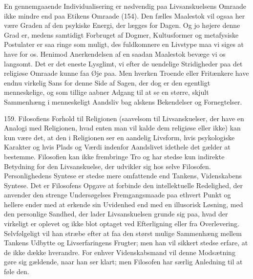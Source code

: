 \documentclass[12pt,a4paper]{book}
\newcommand{\apage}[1]{\marginnote{\footnotesize\textit{[#1]}}}
\begin{document}
En gennemgaaende Individualisering er nødvendig paa Livsanskuelsens Omraade ikke mindre end
paa Etikens Omraade (154). Den fælles Maalestok vil ogsaa her være Graden af den psykiske
Energi, der lægges for Dagen. Og jo højere denne Grad er, medens samtidigt Forbruget af
Dogmer, Kultusformer og metafysiske Postulater er saa ringe som muligt, des fuldkomnere en
Livstype maa vi siges at have for os. Henimod Anerkendelsen af en saadan Maalestok bevæge vi
os langsomt. Det er det eneste Lysglimt, vi efter de uendelige Stridigheder paa det religiøse
Omraade kunne faa Øje paa. Men hverken Troende eller Fritænkere \apage{380} have endnu virkelig Sans for
denne Side af Sagen, der dog er den egentligt menneskelige, og som tillige aabner Adgang til
at se en større, skjult Sammenhæng i menneskeligt Aandsliv bag alskens Bekendelser og
Fornegtelser.

159. Filosofiens Forhold til Religionen (saavelsom til Livsanskuelser, der have en Analogi
med Religionen, hvad enten man vil kalde dem religiøse eller ikke) kan kun være det, at den i
Religionen ser en aandelig Livsform, hvis psykologiske Karakter og hvis Plads og Værdi
indenfor Aandslivet idethele det gælder at bestemme. Filosofien kan ikke frembringe Tro og har
stedse kun indirekte Betydning for den Livsanskuelse, der udvikler sig hos selve Filosofen.
Personlighedens Syntese er stedse mere omfattende end Tankens, Videnskabens Syntese. Det er
Filosofens Opgave at forbinde den intellektuelle Redelighed, der anvender den strenge
Undersøgelses Fremgangsmaade paa ethvert Punkt og hellere ender med at erkende sin Uvidenhed
end med en illusorisk Løsning, med den personlige Sandhed, der lader Livsanskuelsen grunde
sig paa, hvad der virkeligt er oplevet og ikke blot optaget ved Efterligning eller fra
Overlevering. Selvfølgeligt vil han stræbe efter at faa den størst mulige Sammenhæng mellem
Tankens Udbytte og Livserfaringens Frugter; men han vil sikkert stedse erfare, at de ikke
dække hverandre. For enhver Videnskabsmand vil denne Modsætning gøre sig gældende, naar han
ser klart; men Filosofen har særlig Anledning til at føle den.
\end{document}
